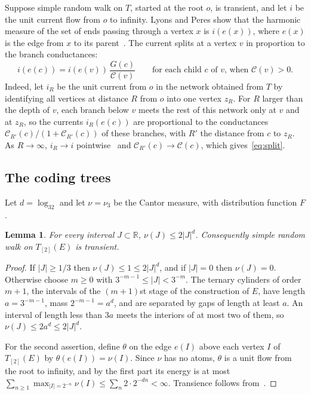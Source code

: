 \documentclass[11pt]{amsart}
\newtheorem{lemma}[theorem]{Lemma}
\theoremstyle{remark}
\newcommand{\R}{\mathbb R}
\begin{document}
Suppose simple random walk on $T$, started at the root $o$, is transient, and let $i$ be the unit current flow from $o$ to infinity. Lyons and Peres show that the harmonic measure of the set of ends passing through a vertex $x$ is $i(e(x))$, where $e(x)$ is the edge from $x$ to its parent~\cite[p.~539]{LP}. The current splits at a vertex $v$ in proportion to the branch conductances:
\begin{equation}\label{eq:split}
i(e(c))=i(e(v))\,\frac{G(c)}{\mathcal C(v)}\qquad\text{for each child $c$ of $v$, when }\mathcal C(v)>0.
\end{equation}
Indeed, let $i_R$ be the unit current from $o$ in the network obtained from $T$ by identifying all vertices at distance $R$ from $o$ into one vertex $z_R$. For $R$ larger than the depth of $v$, each branch below $v$ meets the rest of this network only at $v$ and at $z_R$, so the currents $i_R(e(c))$ are proportional to the conductances $\mathcal C_{R'}(c)/(1+\mathcal C_{R'}(c))$ of these branches, with $R'$ the distance from $c$ to $z_R$. As $R\to\infty$, $i_R\to i$ pointwise~\cite[Proposition~2.12, p.~39]{LP} and $\mathcal C_{R'}(c)\to\mathcal C(c)$, which gives~\eqref{eq:split}.

\subsection*{The coding trees}
Let $d=\log_32$ and let $\nu=\nu_3$ be the Cantor measure, with distribution function $F$.

\begin{lemma}\label{lem:frostman}
For every interval $J\subset\R$, $\nu(J)\le 2|J|^d$. Consequently simple random walk on $T_{[2]}(E)$ is transient.
\end{lemma}

\begin{proof}
If $|J|\ge1/3$ then $\nu(J)\le1\le2|J|^d$, and if $|J|=0$ then $\nu(J)=0$. Otherwise choose $m\ge0$ with $3^{-m-1}\le|J|<3^{-m}$. The ternary cylinders of order $m+1$, the intervals of the $(m+1)$st stage of the construction of $E$, have length $a=3^{-m-1}$, mass $2^{-m-1}=a^d$, and are separated by gaps of length at least $a$. An interval of length less than $3a$ meets the interiors of at most two of them, so $\nu(J)\le 2a^d\le 2|J|^d$.

For the second assertion, define $\theta$ on the edge $e(I)$ above each vertex $I$ of $T_{[2]}(E)$ by $\theta(e(I))=\nu(I)$. Since $\nu$ has no atoms, $\theta$ is a unit flow from the root to infinity, and by the first part its energy is at most $\sum_{n\ge1}\max_{|I|=2^{-n}}\nu(I)\le\sum_n2\cdot2^{-dn}<\infty$. Transience follows from~\cite[Theorem~2.11, p.~39]{LP}.
\end{proof}
\end{document}
